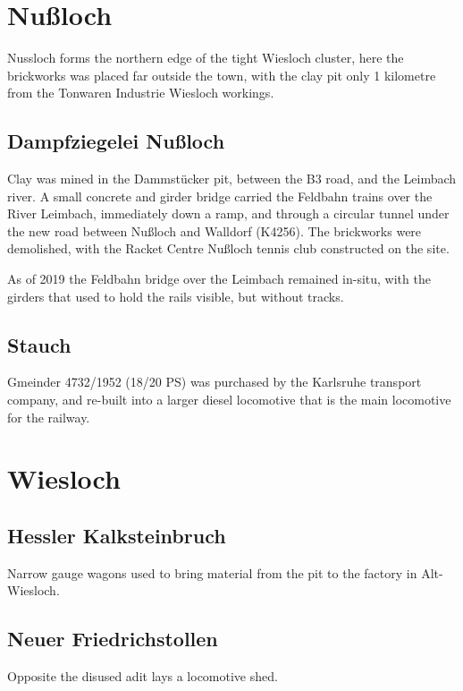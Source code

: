 \documentclass[a4paper]{report}
\begin{document}
\section{Nußloch}

Nussloch forms the northern edge of the tight Wiesloch cluster, here
the brickworks was placed far outside the town, with the clay pit only
1 kilometre from the Tonwaren Industrie Wiesloch workings.

\subsection{Dampfziegelei Nußloch}

Clay was mined in the Dammstücker pit, between the B3 road, and the
Leimbach river.  A small concrete and girder bridge carried the
Feldbahn trains over the River Leimbach, immediately down a ramp, and
through a circular tunnel under the new road between Nußloch and Walldorf
(K4256).  The brickworks were demolished, with the Racket Centre Nußloch
tennis club constructed on the site.

As of 2019 the Feldbahn bridge over the Leimbach remained in-situ, with the
girders that used to hold the rails visible, but without tracks.

\subsection{Stauch}

Gmeinder 4732/1952 (18/20 PS) was purchased by the Karlsruhe transport
company, and re-built into a larger diesel locomotive that is the main
locomotive for the railway.\cite{Dickinson-2014-06-01}


\section{Wiesloch}

\subsection{Hessler Kalksteinbruch}

Narrow gauge wagons used to bring material from the pit to the factory in Alt-Wiesloch.

\subsection{Neuer Friedrichstollen}

Opposite the disused adit lays a locomotive shed.
\end{document}
